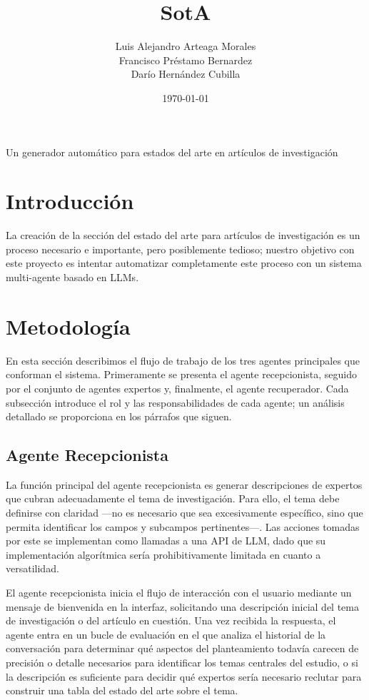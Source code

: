 \documentclass[12pt]{article}
\title{SotA}
\author{Luis Alejandro Arteaga Morales \\ Francisco Préstamo Bernardez \\ Darío Hernández Cubilla}
\date{\today}
\newcommand{\subtitle}{Un generador automático para estados del arte en artículos de investigación}
\begin{document}
\begin{center}
    {\LARGE \thetitle\par}
    \vspace{0.5em}
    {\large \subtitle\par}
    \vspace{1em}
    {\large \theauthor\par}
    \vspace{0.5em}
    {\normalsize \thedate\par}
\end{center}

\vspace{2em}

\tableofcontents
\newpage

\section{Introducción}
La creación de la sección del estado del arte para artículos de investigación es un proceso necesario e importante, pero posiblemente tedioso; nuestro objetivo con este proyecto es intentar automatizar completamente este proceso con un sistema multi-agente basado en LLMs.

\section{Metodología}
En esta sección describimos el flujo de trabajo de los tres agentes principales que conforman el sistema. Primeramente se presenta el agente recepcionista, seguido por el conjunto de agentes expertos y, finalmente, el agente recuperador. Cada subsección introduce el rol y las responsabilidades de cada agente; un análisis detallado se proporciona en los párrafos que siguen.

\subsection{Agente Recepcionista}
La función principal del agente recepcionista es generar descripciones de expertos que cubran adecuadamente el tema de investigación. Para ello, el tema debe definirse con claridad —no es necesario que sea excesivamente específico, sino que permita identificar los campos y subcampos pertinentes—. Las acciones tomadas por este se implementan como llamadas a una API de LLM, dado que su implementación algorítmica sería prohibitivamente limitada en cuanto a versatilidad.

El agente recepcionista inicia el flujo de interacción con el usuario mediante un mensaje de bienvenida en la interfaz, solicitando una descripción inicial del tema de investigación o del artículo en cuestión. Una vez recibida la respuesta, el agente entra en un bucle de evaluación en el que analiza el historial de la conversación para determinar qué aspectos del planteamiento todavía carecen de precisión o detalle necesarios para identificar los temas centrales del estudio, o si la descripción es suficiente para decidir qué expertos sería necesario reclutar para construir una tabla del estado del arte sobre el tema. 
\end{document}
